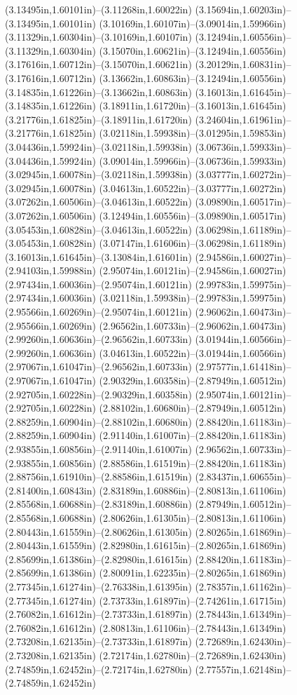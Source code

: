 (3.13495in,1.60101in)--(3.11268in,1.60022in) (3.15694in,1.60203in)--(3.13495in,1.60101in) (3.10169in,1.60107in)--(3.09014in,1.59966in) (3.11329in,1.60304in)--(3.10169in,1.60107in) (3.12494in,1.60556in)--(3.11329in,1.60304in) (3.15070in,1.60621in)--(3.12494in,1.60556in) (3.17616in,1.60712in)--(3.15070in,1.60621in) (3.20129in,1.60831in)--(3.17616in,1.60712in) (3.13662in,1.60863in)--(3.12494in,1.60556in) (3.14835in,1.61226in)--(3.13662in,1.60863in) (3.16013in,1.61645in)--(3.14835in,1.61226in) (3.18911in,1.61720in)--(3.16013in,1.61645in) (3.21776in,1.61825in)--(3.18911in,1.61720in) (3.24604in,1.61961in)--(3.21776in,1.61825in) (3.02118in,1.59938in)--(3.01295in,1.59853in) (3.04436in,1.59924in)--(3.02118in,1.59938in) (3.06736in,1.59933in)--(3.04436in,1.59924in) (3.09014in,1.59966in)--(3.06736in,1.59933in) (3.02945in,1.60078in)--(3.02118in,1.59938in) (3.03777in,1.60272in)--(3.02945in,1.60078in) (3.04613in,1.60522in)--(3.03777in,1.60272in) (3.07262in,1.60506in)--(3.04613in,1.60522in) (3.09890in,1.60517in)--(3.07262in,1.60506in) (3.12494in,1.60556in)--(3.09890in,1.60517in) (3.05453in,1.60828in)--(3.04613in,1.60522in) (3.06298in,1.61189in)--(3.05453in,1.60828in) (3.07147in,1.61606in)--(3.06298in,1.61189in) (3.16013in,1.61645in)--(3.13084in,1.61601in) (2.94586in,1.60027in)--(2.94103in,1.59988in) (2.95074in,1.60121in)--(2.94586in,1.60027in) (2.97434in,1.60036in)--(2.95074in,1.60121in) (2.99783in,1.59975in)--(2.97434in,1.60036in) (3.02118in,1.59938in)--(2.99783in,1.59975in) (2.95566in,1.60269in)--(2.95074in,1.60121in) (2.96062in,1.60473in)--(2.95566in,1.60269in) (2.96562in,1.60733in)--(2.96062in,1.60473in) (2.99260in,1.60636in)--(2.96562in,1.60733in) (3.01944in,1.60566in)--(2.99260in,1.60636in) (3.04613in,1.60522in)--(3.01944in,1.60566in) (2.97067in,1.61047in)--(2.96562in,1.60733in) (2.97577in,1.61418in)--(2.97067in,1.61047in) (2.90329in,1.60358in)--(2.87949in,1.60512in) (2.92705in,1.60228in)--(2.90329in,1.60358in) (2.95074in,1.60121in)--(2.92705in,1.60228in) (2.88102in,1.60680in)--(2.87949in,1.60512in) (2.88259in,1.60904in)--(2.88102in,1.60680in) (2.88420in,1.61183in)--(2.88259in,1.60904in) (2.91140in,1.61007in)--(2.88420in,1.61183in) (2.93855in,1.60856in)--(2.91140in,1.61007in) (2.96562in,1.60733in)--(2.93855in,1.60856in) (2.88586in,1.61519in)--(2.88420in,1.61183in) (2.88756in,1.61910in)--(2.88586in,1.61519in) (2.83437in,1.60655in)--(2.81400in,1.60843in) (2.83189in,1.60886in)--(2.80813in,1.61106in) (2.85568in,1.60688in)--(2.83189in,1.60886in) (2.87949in,1.60512in)--(2.85568in,1.60688in) (2.80626in,1.61305in)--(2.80813in,1.61106in) (2.80443in,1.61559in)--(2.80626in,1.61305in) (2.80265in,1.61869in)--(2.80443in,1.61559in) (2.82980in,1.61615in)--(2.80265in,1.61869in) (2.85699in,1.61386in)--(2.82980in,1.61615in) (2.88420in,1.61183in)--(2.85699in,1.61386in) (2.80091in,1.62235in)--(2.80265in,1.61869in) (2.77345in,1.61274in)--(2.76338in,1.61395in) (2.78357in,1.61162in)--(2.77345in,1.61274in) (2.73733in,1.61897in)--(2.74261in,1.61715in) (2.76082in,1.61612in)--(2.73733in,1.61897in) (2.78443in,1.61349in)--(2.76082in,1.61612in) (2.80813in,1.61106in)--(2.78443in,1.61349in) (2.73208in,1.62135in)--(2.73733in,1.61897in) (2.72689in,1.62430in)--(2.73208in,1.62135in) (2.72174in,1.62780in)--(2.72689in,1.62430in) (2.74859in,1.62452in)--(2.72174in,1.62780in) (2.77557in,1.62148in)--(2.74859in,1.62452in) 